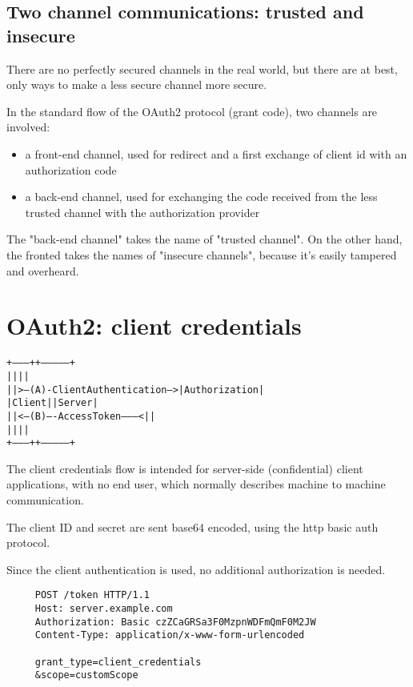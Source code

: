 \documentclass[11pt]{style}
\begin{document}
\subsection{Two channel communications: trusted and insecure}
There are no perfectly secured channels in the real world, but there are at
best, only ways to make a less secure channel more secure.

In the standard flow of the OAuth2 protocol (grant code), two channels are
involved:
\begin{itemize}
    \item a front-end channel, used for redirect and a first exchange of client
        id with an authorization code
    \item a back-end channel, used for exchanging the code received from the
        less trusted channel with the authorization provider
\end{itemize}

The "back-end channel" takes the name of "trusted channel". On the other hand,
the fronted takes the names of "insecure channels", because it's easily tampered
and overheard.

\section{OAuth2: client credentials}
\begin{alltt}
     +---------+                                  +---------------+
     |         |                                  |               |
     |         |>--(A)- Client Authentication --->| Authorization |
     | Client  |                                  |     Server    |
     |         |<--(B)---- Access Token ---------<|               |
     |         |                                  |               |
     +---------+                                  +---------------+
\end{alltt}
The client credentials flow is intended for server-side (confidential) client
applications, with no end user, which normally describes machine to machine
communication.

The client ID and secret are sent base64 encoded, using the http basic
auth protocol.

Since the client authentication is used, no additional authorization is needed.

\begin{lstlisting}
     POST /token HTTP/1.1
     Host: server.example.com
     Authorization: Basic czZCaGRSa3F0MzpnWDFmQmF0M2JW
     Content-Type: application/x-www-form-urlencoded

     grant_type=client_credentials
     &scope=customScope
\end{lstlisting}
\end{document}
